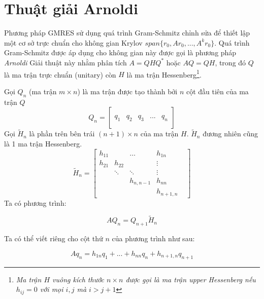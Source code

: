\section{Thuật giải Arnoldi}
Phương pháp GMRES sử dụng quá trình Gram-Schmitz chỉnh sửa để thiết lập
một cơ sở trực chuẩn cho không gian Krylov $span\{r_0, Ar_0, ..., A^kr_0 \}$.
Quá trình Gram-Schmitz được áp dụng cho không gian này được gọi là phương pháp \textit{Arnoldi}
Giải thuật này nhằm phân tích $A=QHQ^*$ hoặc $AQ = QH$, trong đó $Q$ là ma trận trực chuẩn (unitary) 
còn $H$ là ma trận Hessenberg\footnote{
    \textit{
    Ma trận $H$ vuông kích thước $n \times n$ được gọi là ma trận upper Hessenberg nếu
    $h_{ij} = 0$ với mọi $i,j$ mà $i > j + 1$
}
}.

Gọi $Q_n$ (ma trận $m \times n$) là ma trận được tạo thành bởi $n$ cột đầu tiên của ma trận $Q$
\begin{equation}
    Q_n = \left[
        \begin{array}{c|c|c|c|c}
        &  &  &  \\
        &  &  &  \\
        q_1 & q_2 &  q_3 & ... &  q_n \\
        &  &  &  \\
        &  &  &  
        \end{array}
    \right]
\end{equation}
Gọi $\tilde{H}_n$ là phần trên bên trái $(n + 1) \times n$ của ma trận $H$.
$\tilde{H}_n$ đương nhiên cũng là 1 ma trận Hessenberg. 
\begin{equation}
    \tilde{H}_n = \begin{bmatrix}
        h_{11} &  & \ldots & h_{1n} & \\
        h_{21} & h_{22} & & \vdots \\
        & \ddots & \ddots & \vdots \\ 
        & & h_{n, n-1} & h_{nn} \\
        & & & h_{n+1,n}    
    \end{bmatrix}
\end{equation}
Ta có phương trình:

\begin{equation}
    AQ_n = Q_{n + 1}\tilde{H}_n \label{arnoldi:1}
\end{equation}

Ta có thể viết riêng cho cột thứ $n$ của phương trình như sau:

\begin{equation}
    Aq_n = h_{1n}q_1 + ... + h_{nn}q_n + h_{n+1,n}q_{n + 1}
\end{equation}

